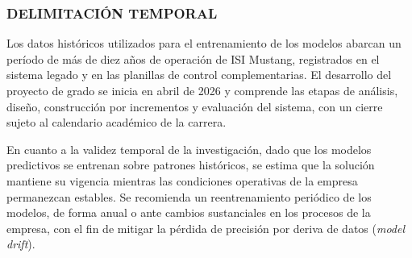 \subsubsection{DELIMITACIÓN TEMPORAL}

Los datos históricos utilizados para el entrenamiento de los modelos abarcan un período de más de diez años de operación de ISI Mustang, registrados en el sistema legado y en las planillas de control complementarias. El desarrollo del proyecto de grado se inicia en abril de 2026 y comprende las etapas de análisis, diseño, construcción por incrementos y evaluación del sistema, con un cierre sujeto al calendario académico de la carrera.

En cuanto a la validez temporal de la investigación, dado que los modelos predictivos se entrenan sobre patrones históricos, se estima que la solución mantiene su vigencia mientras las condiciones operativas de la empresa permanezcan estables. Se recomienda un reentrenamiento periódico de los modelos, de forma anual o ante cambios sustanciales en los procesos de la empresa, con el fin de mitigar la pérdida de precisión por deriva de datos (\textit{model drift}).
